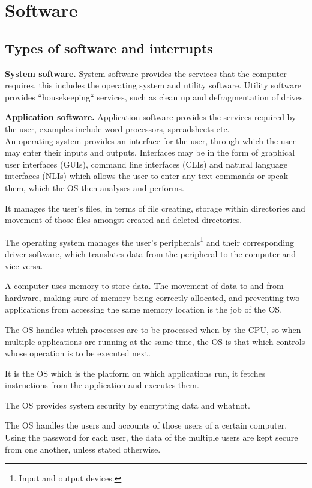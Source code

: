 \section{Software}
\subsection{Types of software and interrupts}

\textbf{System software.} System software provides the services that the computer requires, 
this includes the operating system and utility software. Utility software provides ``housekeeping``
services, such as clean up and defragmentation of drives.

\textbf{Application software.} Application software provides the services required by the user,
examples include word processors, spreadsheets etc.\\

An operating system provides an interface for the user, through which the user may enter their 
inputs and outputs. Interfaces may be in the form of graphical user interfaces (GUIs), command line
interfaces (CLIs) and natural language interfaces (NLIs) which allows the user to enter any text
commands or speak them, which the OS then analyses and performs.

It manages the user's files, in terms of file creating, storage within directories and movement
of those files amongst created and deleted directories.

The operating system manages the user's peripherals\footnote{Input and output devices.} and their
corresponding driver software, which translates data from the peripheral to the computer and
vice versa.

A computer uses memory to store data. The movement of data to and from hardware, making sure of
memory being correctly allocated, and preventing two applications from accessing the same memory
location is the job of the OS.

The OS handles which processes are to be processed when by the CPU, so when multiple applications
are running at the same time, the OS is that which controls whose operation is to be executed next.

It is the OS which is the platform on which applications run, it fetches instructions from the
application and executes them.

The OS provides system security by encrypting data and whatnot.

The OS handles the users and accounts of those users of a certain computer. Using the password
for each user, the data of the multiple users are kept secure from one another, unless stated
otherwise.

